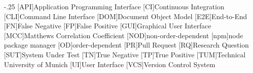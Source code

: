 
\begin{acronym}
    \itemsep-.25\baselineskip
    [API]{Application Programming Interface}
    [CI]{Continuous Integration}
    [CLI]{Command Line Interface}
    [DOM]{Document Object Model}
    [E2E]{End-to-End}
    [FN]{False Negative}
    [FP]{False Positive}
    [GUI]{Graphical User Interface}
    [MCC]{Matthews Correlation Coefficient}
    [NOD]{non-order-dependent}
    [npm]{node package manager}
    [OD]{order-dependent}
    [PR]{Pull Request}
    [RQ]{Research Question}
    [SUT]{System Under Test}
    [TN]{True Negative}
    [TP]{True Positive}
    [TUM]{Technical University of Munich}
    [UI]{User Interface}
    [VCS]{Version Control System}
\end{acronym}
